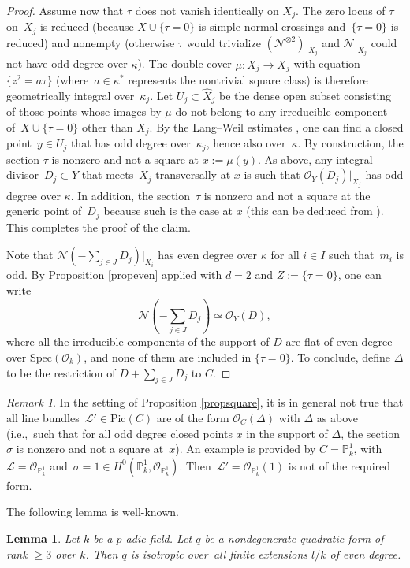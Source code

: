 \documentclass{amsart}
\newtheorem{lem}[thm]{Lemma}
\theoremstyle{definition}
\theoremstyle{remark}
\newtheorem{rem}[thm]{Remark}
\numberwithin{equation}{section}
\newcommand{\Spec}{\mathrm{Spec}}
\newcommand{\Pic}{\mathrm{Pic}}
\def\ie{i.e.,\ }
\def\P{\mathbb P}
\def\cN{\mathcal{N}}
\def\cL{\mathcal{L}}
\def\cO{\mathcal{O}}
\def\whX{\widehat{X}}
\begin{document}
\begin{proof}
Assume now that $\tau$ does not vanish identically on $X_j$. The zero locus of $\tau$ on~$X_j$ is reduced (because $X\cup\{\tau=0\}$ is simple normal crossings and~${\{\tau=0\}}$ is reduced) and nonempty (otherwise $\tau$ would trivialize $(\cN^{\otimes 2})|_{X_j}$ and $\cN|_{X_j}$ could not have odd degree over $\kappa$). The double cover $\mu:\whX_j\to X_j$ with equation~${\{z^2=a\tau\}}$ (where~$a\in\kappa^*$ represents the nontrivial square class) is therefore geometrically integral over~$\kappa_j$. 
Let $U_j\subset \whX_j$ be the dense open subset consisting of those points whose images by $\mu$ do not belong to any irreducible component of~$X\cup\{\tau=0\}$ other than $X_j$.
By the Lang--Weil estimates \cite[Corollary 3]{LangWeil},
one can find a closed point~$y\in U_j$ that has odd degree over~$\kappa_j$, hence also over~$\kappa$.
By construction, the section $\tau$ is nonzero and not a square at $x:=\mu(y)$.
As above, any integral divisor~$D_j\subset Y$ that meets~$X_j$ transversally at $x$ is such that $\cO_Y(D_j)|_{X_j}$ has odd degree over $\kappa$. In addition, the section~$\tau$ is nonzero and not a square at the generic point of~$D_j$ because such is the case at $x$ (this can be deduced from \cite[Lemma 19.5]{EKM}).
This completes the proof of the claim.

Note that $\cN(-\sum_{j\in J}D_j)|_{X_i}$ has even degree over $\kappa$ for all $i\in I$ such that~$m_i$ is odd. By Proposition \ref{propeven} applied with $d=2$ and $Z:=\{\tau=0\}$, one can write 
$$\cN(-\sum_{j\in J}D_j)\simeq\cO_Y(D),$$
 where all the irreducible components of the support of $D$ are flat of even degree over $\Spec(\cO_k)$, and none of them are included in $\{\tau=0\}$. To conclude, define $\Delta$ to be the restriction of $D+\sum_{j\in J}D_j$ to $C$.
\end{proof}

\begin{rem}
In the setting of Proposition \ref{propsquare}, it is in general not true that all line bundles~$\cL'\in \Pic(C)$ are of the form $\cO_C(\Delta)$ with $\Delta$ as above
(\ie such that for all odd degree closed points $x$
in the support of $\Delta$, the section $\sigma$ is nonzero and not a square at~$x$).
An example is provided by $C=\P^1_k$, with $\cL=\cO_{\P^1_k}$ and~$\sigma=1\in H^0(\P^1_k,\cO_{\P^1_k})$. Then~$\cL'=\cO_{\P^1_k}(1)$ is not of the required form.
\end{rem}

The following lemma is well-known.

\begin{lem}
\label{lemrg3}
Let $k$ be a $p$-adic field. 
Let $q$ be a nondegenerate quadratic form of rank $\geq 3$ over $k$. 
Then $q$ is isotropic over~all finite extensions $l/k$ of even degree.
\end{lem}
\end{document}
